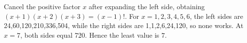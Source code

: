 Cancel the positive factor $x$ after expanding the left side, obtaining $(x+1)(x+2)(x+3)=(x-1)!$. For $x=1,2,3,4,5,6$, the left sides are 24,60,120,210,336,504, while the right sides are 1,1,2,6,24,120, so none works. At $x=7$, both sides equal 720. Hence the least value is $\boxed7$.
